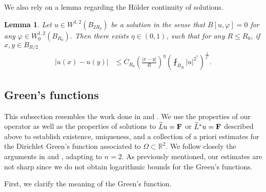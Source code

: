 \documentclass[12pt,reqno]{amsart}
\theoremstyle{plain}
\newtheorem{lem}{Lemma}
\theoremstyle{definition}
\newcommand{\disp}{\displaystyle}
\newcommand{\vp}{\varphi}
\newcommand{\Om}{\Omega}
\newcommand{\su}{\subset}
\newcommand{\abs}[1]{\left\vert#1\right\vert}
\newcommand{\brac}[1]{\left[#1\right]}
\newcommand{\pr}[1]{\left( #1 \right) }
\newcommand{\R}{\ensuremath{\mathbb{R}}}
\begin{document}
\begin{appendix}
We also rely on a lemma regarding the H\"older continuity of solutions.

\begin{lem}{\rm\cite[Lemma~6.6]{DHM16}}
Let $u \in W^{1,2}\pr{B_{2R_0}}$ be a solution in the sense that $\disp {B}\brac{u, \vp} = 0$ for any $\vp \in W^{1,2}_0\pr{B_{R_0}}$.
Then there exists $\eta \in \pr{0,1}$, such that for any $R \le R_0$, if $x, y \in B_{R/2}$
\begin{align}
\abs{u\pr{x} - u\pr{y}}
&\le C_{R_0} \pr{\frac{\abs{x-y}}{R}}^\eta  \pr{\fint_{B_{R}} \abs{u}^{2^*} }^{\frac 1 {2^*}}.
\label{eqB.11}
\end{align}
\end{lem}

\subsection*{Green's functions}

This subsection resembles the work done in \cite{HK07} and \cite{DHM16}.
We use the properties of our operator as well as the properties of solutions to $\widetilde{L}u = \bf F$ or $\widetilde{L}^* u = \bf F$ described above to establish existence, uniqueness, and a collection of a priori estimates for the Dirichlet Green's function associated to $\Om \su \R^2$.
We follow closely the arguments in \cite{HK07} and \cite{DHM16}, adapting to $n = 2$.
As previously mentioned, our estimates are not sharp since we do not obtain logarithmic bounds for the Green's functions.

First, we clarify the meaning of the Green's function.


\end{appendix}
\end{document}

